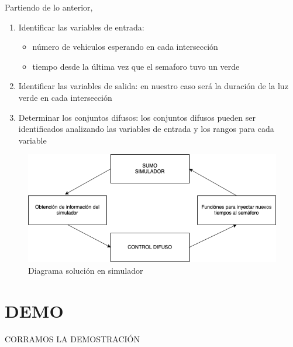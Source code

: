\documentclass[
	11pt, %
]{beamer}
\begin{document}
\begin{frame}
  Partiendo de lo anterior,

  \begin{enumerate}
  \item Identificar las variables de entrada:
    
    \begin{itemize}
    \item número de vehiculos esperando en cada intersección
    \item tiempo desde la última vez que el semaforo tuvo un verde
    \end{itemize}

  \item Identificar las variables de salida: en nuestro caso será la duración de la luz verde en cada intersección

  \item Determinar los conjuntos difusos: los conjuntos difusos pueden ser identificados analizando las variables de entrada y los rangos para cada variable
  \end{enumerate}
\end{frame}

\begin{frame}
  \begin{figure}
    \includegraphics[width=0.9
      \linewidth]{diagrama_sumo.png}
    \caption{Diagrama solución en simulador}
  \end{figure}
\end{frame}

\section{DEMO}
\begin{frame}
  \begin{center}
    CORRAMOS LA DEMOSTRACIÓN
  \end{center}
\end{frame}
\end{document}
